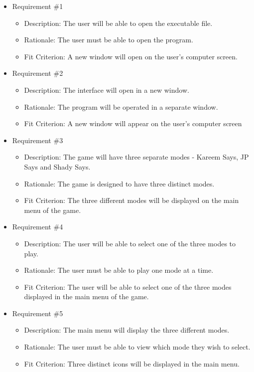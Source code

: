 \documentclass[12pt, titlepage]{article}
\begin{document}
\begin{itemize}

\item Requirement \#1
\begin{itemize}
\item Description: The user will be able to open the executable file.
\item Rationale: The user must be able to open the program.
\item Fit Criterion: A new window will open on the user's computer screen.
\end{itemize}

\item Requirement \#2
\begin{itemize}
\item Description: The  interface will open in a new window.
\item Rationale: The program will be operated in a separate window. 
\item Fit Criterion: A new window will appear on the user's computer screen
\end{itemize}

\item Requirement \#3
\begin{itemize}
\item Description: The game will have three separate modes - Kareem Says, JP Says and Shady Says.
\item Rationale: The game is designed to have three distinct modes.
\item Fit Criterion: The three different modes will be displayed on the main menu of the game. 
\end{itemize}

\item Requirement \#4
\begin{itemize}
\item Description: The user will be able to select one of the three modes to play.
\item Rationale: The user must be able to play one mode at a time. 
\item Fit Criterion: The user will be able to select one of the three modes displayed in the main menu of the game.
\end{itemize}

\item Requirement \#5
\begin{itemize}
\item Description: The main menu will display the three different modes. 
\item Rationale: The user must be able to view which mode they wish to select.
\item Fit Criterion: Three distinct icons will be displayed in the main menu.
\end{itemize}


\end{itemize}
\end{document}

